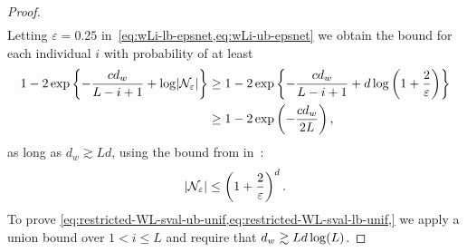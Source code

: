 \begin{proof}
\begin{align}
	\end{align}
	Letting $\varepsilon = 0.25$ in~\cref{eq:wLi-lb-epsnet,eq:wLi-ub-epsnet} we obtain the bound for each individual $i$ with probability of at least
	\begin{align*}
		1 - 2 \exp\left\{-\frac{c d_w}{L-i+1} + \log \lvert\mathcal{N}_{\varepsilon}\rvert\right\} & \geq
		1 - 2 \exp\left\{-\frac{c d_w}{L-i+1} + d \log \left(1 + \frac{2}{\varepsilon}\right)\right\} \\
		                                                                           & \geq
		1 - 2\exp\left(-\frac{c d_w}{2L}\right),
	\end{align*}
	as long as $d_w \gtrsim L d$, using the bound from in~\citep[Corollary 4.2.13]{Ver18}:
	\[
		\lvert\mathcal{N}_{\varepsilon}\rvert \leq \left(1 + \frac{2}{\varepsilon}\right)^{d}.
	\]
    To prove \cref{eq:restricted-WL-sval-ub-unif,eq:restricted-WL-sval-lb-unif,}
	we apply a union bound over $1 < i \leq L$ and require that
	$d_{w} \gtrsim L d \log (L)$.
\end{proof}

